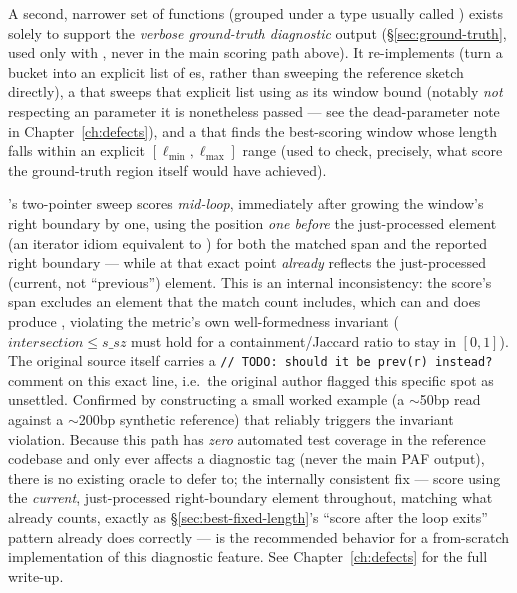 A second, narrower set of functions (grouped under a type usually called ) exists
solely to support the \emph{verbose ground-truth diagnostic} output (\S\ref{sec:ground-truth},
used only with , never in the main scoring path above). It re-implements
 (turn a bucket into an explicit list of es, rather than
sweeping the reference sketch directly), a  that sweeps that explicit list
using  as its window bound (notably \emph{not} respecting an
 parameter it is nonetheless passed --- see the dead-parameter note in
Chapter~\ref{ch:defects}), and a  that finds the best-scoring window
whose length falls within an explicit $[\ell_{\min}, \ell_{\max}]$ range (used to check, precisely,
what score the ground-truth region itself would have achieved).

\begin{bugbox}
\label{sec:defect-prevr}
's two-pointer sweep scores \emph{mid-loop}, immediately after growing
the window's right boundary by one, using the position \emph{one before} the just-processed
element (an iterator idiom equivalent to ) for both the matched span and the
reported right boundary --- while  at that exact point \emph{already} reflects
the just-processed (current, not ``previous'') element. This is an internal inconsistency: the
score's span excludes an element that the match count includes, which can and does produce
, violating the metric's own well-formedness invariant
($\mathit{intersection} \le s\_sz$ must hold for a containment/Jaccard ratio to stay in $[0,1]$).
The original source itself carries a \texttt{// TODO: should it be prev(r) instead?} comment on
this exact line, i.e.\ the original author flagged this specific spot as unsettled. Confirmed by
constructing a small worked example (a $\sim$50bp read against a $\sim$200bp synthetic reference)
that reliably triggers the invariant violation. Because this path has \emph{zero} automated test
coverage in the reference codebase and only ever affects a diagnostic tag (never the main PAF
output), there is no existing oracle to defer to; the internally consistent fix --- score using
the \emph{current}, just-processed right-boundary element throughout, matching what
 already counts, exactly as \S\ref{sec:best-fixed-length}'s ``score after the
loop exits'' pattern already does correctly --- is the recommended behavior for a from-scratch
implementation of this diagnostic feature. See Chapter~\ref{ch:defects} for the full write-up.
\end{bugbox}

